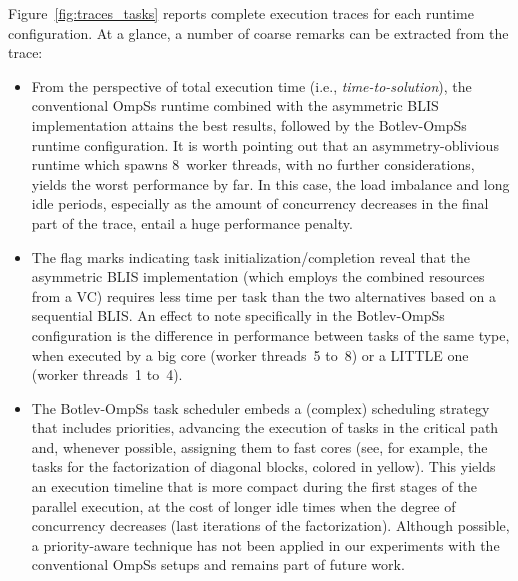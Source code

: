 Figure~\ref{fig:traces_tasks} reports complete execution traces for each runtime configuration. 
At a glance, a number of coarse remarks can be
extracted from the trace:
\begin{itemize}
\item From the perspective of total execution time (i.e., {\em time-to-solution}), the conventional OmpSs runtime combined with 
      the asymmetric BLIS implementation attains the best results, followed by the Botlev-OmpSs runtime configuration. It is worth pointing out that
      an asymmetry-oblivious runtime which spawns 8~worker threads, with no further considerations, yields the worst performance by far. In this case, the
      load imbalance and long idle periods, especially as the amount of concurrency decreases in the final part of the trace, entail
      a huge performance penalty. 
\item The flag marks indicating task initialization/completion reveal that 
      the asymmetric BLIS implementation (which employs the combined resources from a VC) requires less time per task than 
      the two alternatives based on a sequential BLIS. An effect to note specifically in the Botlev-OmpSs configuration is the
      difference in performance between tasks of the same type, when
      executed by a big core (worker threads~5 to~8) or a LITTLE one (worker threads~1 to~4).
\item The Botlev-OmpSs task scheduler embeds a (complex) scheduling strategy that includes priorities,
      advancing the execution of tasks in the critical path and, whenever possible, assigning them to fast cores (see, for 
      example, the tasks for the factorization of diagonal blocks, 
      colored in yellow). This yields an execution timeline that is more compact during the first stages of the parallel execution, 
      at the cost of longer idle times when the degree of concurrency decreases (last iterations of the factorization). 
      Although possible, a priority-aware technique has not been applied in our experiments with the conventional OmpSs setups
      and remains part of future work.
\end{itemize}


